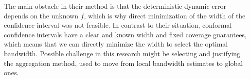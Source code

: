 \documentclass[a4paper,14pt]{extarticle}
\begin{document}
The main obstacle in their method is that the deterministic dynamic error depends
on the unknown $f$, which is why direct minimization of the width of the confidence
interval was not feasible. In contrast to their situation, conformal confidence
intervals have a clear and known width and fixed coverage guarantees, which means
that we can directly minimize the width to select the optimal bandwidth. Possible
challenge in this research might be selecting and justifying the aggregation method,
used to move from local bandwidth estimates to global ones.



% 
\clearpage


\end{document}

